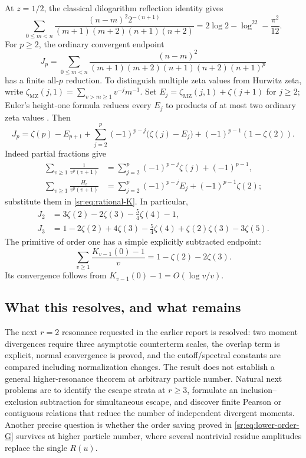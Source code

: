 At $z=1/2$, the classical dilogarithm reflection identity
\cite[25.12.6]{dlmfpolylog} gives
\begin{equation}\label{sr:eq:half-polylog}
 \sum_{0\le m<n}\frac{(n-m)^2 2^{-(n+1)}}
 {(m+1)(m+2)(n+1)(n+2)}
 =2\log2-\log^22-\frac{\pi^2}{12}.
\end{equation}
For $p\ge2$, the ordinary convergent endpoint
\[
 J_p=\sum_{0\le m<n}\frac{(n-m)^2}
 {(m+1)(m+2)(n+1)(n+2)(n+1)^p}
\]
has a finite all-$p$ reduction. To distinguish multiple zeta values
from Hurwitz zeta, write
$\zeta_{\mathrm{MZ}}(j,1)=\sum_{v>m\ge1}v^{-j}m^{-1}$.
Set $E_j=\zeta_{\mathrm{MZ}}(j,1)+\zeta(j+1)$ for
$j\ge2$; Euler's height-one formula reduces every $E_j$ to products
of at most two ordinary zeta values \cite[Section~6]{incoming-determinantal}.
Then
\begin{equation}\label{sr:eq:allp-endpoint}
 J_p=\zeta(p)-E_{p+1}
 +\sum_{j=2}^{p}(-1)^{p-j}\bigl(\zeta(j)-E_j\bigr)
 +(-1)^{p-1}(1-\zeta(2)).
\end{equation}
Indeed partial fractions give
\begin{align*}
 \sum_{v\ge1}\frac1{v^p(v+1)}
 &=\sum_{j=2}^p(-1)^{p-j}\zeta(j)+(-1)^{p-1},\\
 \sum_{v\ge1}\frac{H_v}{v^p(v+1)}
 &=\sum_{j=2}^p(-1)^{p-j}E_j+(-1)^{p-1}\zeta(2);
\end{align*}
substitute them in \eqref{sr:eq:rational-K}. In particular,
\begin{align}
 J_2&=3\zeta(2)-2\zeta(3)-\tfrac54\zeta(4)-1,\label{sr:eq:J2}\\
 J_3&=1-2\zeta(2)+4\zeta(3)-\tfrac54\zeta(4)
       +\zeta(2)\zeta(3)-3\zeta(5).
 \label{sr:eq:J3}
\end{align}
The primitive of order one has a simple explicitly subtracted endpoint:
\begin{equation}\label{sr:eq:subtracted-J1}
 \sum_{v\ge1}\frac{K_{v-1}(0)-1}{v}
 =1-\zeta(2)-2\zeta(3).
\end{equation}
Its convergence follows from $K_{v-1}(0)-1=O(\log v/v)$.

\subsection{What this resolves, and what remains}
The next $r=2$ resonance requested in the earlier report is resolved:
two moment divergences require three asymptotic counterterm scales,
the overlap term is explicit, normal convergence is proved, and the
cutoff/spectral constants are compared including normalization changes.
The result does not establish a general higher-resonance theorem at
arbitrary particle number. Natural next problems are to identify the
escape strata at $r\ge3$, formulate an inclusion--exclusion subtraction
for simultaneous escape, and discover finite Pearson or contiguous
relations that reduce the number of independent divergent moments.
Another precise question is whether the order saving proved in
\eqref{sr:eq:lower-order-G} survives at higher particle number, where
several nontrivial residue amplitudes replace the single $R(u)$.
